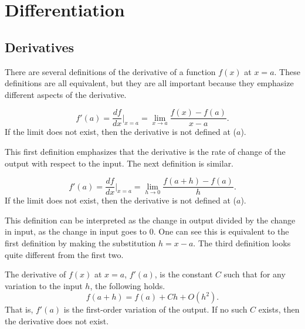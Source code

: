 \documentclass[twoside,openright,titlepage,a4paper]{book}
\begin{document}
\begin{sloppypar}
\chapter{Differentiation} \label{ChDifferentiation}

\section{Derivatives} \label{ChDifferentiationSecDerivatives}

There are several definitions of the derivative of a function $f(x)$ at $x=a$. These definitions are all equivalent, but they are all important because they emphasize different aspects of the derivative.
\begin{definitionbox}[title=\textbf{Derivative (first definition)}]
	\begin{equation*}
	f'(a) = \frac{df}{dx} \bigg|_{x=a} = \lim_{x \rightarrow a} \frac{f(x)-f(a)}{x-a}.
	\end{equation*}
	If the limit does not exist, then the derivative is not defined at ($a$).
\end{definitionbox}

This first definition emphasizes that the derivative is the rate of change of the output with respect to the input. The next definition is similar.
\begin{definitionbox}[title=\textbf{Derivative (second definition)}]
\begin{equation*}
f'(a) = \frac{df}{dx} \bigg|_{x=a} = \lim_{h \rightarrow 0} \frac{f(a+h)-f(a)}{h}.
\end{equation*}
If the limit does not exist, then the derivative is not defined at ($a$).
\end{definitionbox}

This definition can be interpreted as the change in output divided by the change in input, as the change in input goes to 0. One can see this is equivalent to the first definition by making the substitution $h = x-a$. The third definition looks quite different from the first two.
\begin{definitionbox}[title=\textbf{Derivative (third definition)}]
The derivative of $f(x)$ at $x=a$, $f'(a)$, is the constant $C$ such that for any variation to the input $h$, the following holds.
\begin{equation*}
f(a+h) = f(a) + Ch + O(h^2).
\end{equation*}
That is, $f'(a)$ is the first-order variation of the output. If no such $C$ exists, then the derivative does not exist.
\end{definitionbox}


\end{sloppypar}
\end{document}
